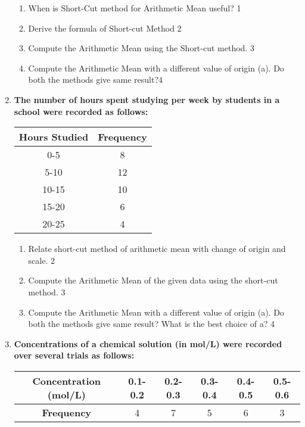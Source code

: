 \documentclass[a4paper,oneside]{book}
\begin{document}
\begin{enumerate}
    \begin{enumerate}
    \item
	When is Short-Cut method for Arithmetic Mean useful? \hfill 1
    \item
	Derive the formula of Short-cut Method \hfill 2
    \item  
	Compute the Arithmetic Mean using the Short-cut method. \hfill 3
    \item
	Compute the Arithmetic Mean with a different value of origin (a). Do both the methods give same result?\hfill 4
  \end{enumerate}
  
     \item
\textbf{The number of hours spent studying per week by students in a school were recorded as follows:}

\begin{table}[h]
\centering
\begin{tabular}{c|c}
\textbf{Hours Studied} & \textbf{Frequency} \\ \hline
0-5                   & 8                  \\ \hline
5-10                  & 12                 \\ \hline
10-15                 & 10                 \\ \hline
15-20                 & 6                  \\ \hline
20-25                 & 4                 
\end{tabular}
\end{table}

    \begin{enumerate}
    \item
	Relate short-cut method of arithmetic mean with change of origin and scale. \hfill 2
    \item  
	Compute the Arithmetic Mean of the given data using the short-cut method. \hfill 3
    \item
	Compute the Arithmetic Mean with a different value of origin (a). Do both the methods give same result? What is the best choice of a? \hfill 4
  \end{enumerate}
  
  \item
\textbf{Concentrations of a chemical solution (in mol/L) were recorded over 
several trials as follows:} 

\begin{table}[h]
\centering
\begin{tabular}{c|ccccc}
\textbf{Concentration (mol/L)} & 0.1-0.2 & 0.2-0.3 & 0.3-0.4 & 0.4-0.5 & 0.5-0.6 \\ \hline
\textbf{Frequency}             & 4       & 7       & 5       & 6       & 3       
\end{tabular}
\end{table}


\end{enumerate}
\end{document}
